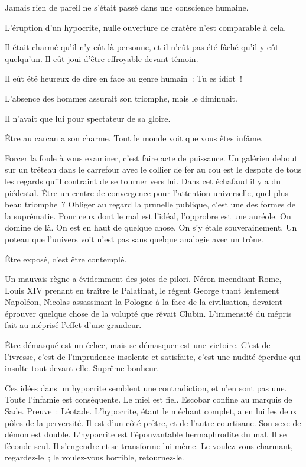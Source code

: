 \documentclass[french,twoside]{book} %
\begin{document}
Jamais rien de pareil ne s’était passé dans une conscience humaine.\par
L’éruption d’un hypocrite, nulle ouverture de cratère n’est comparable à cela.\par
Il était charmé qu’il n’y eût là personne, et il n’eût pas été fâché qu’il y eût quelqu’un. Il eût joui d’être effroyable devant témoin.\par
 Il eût été heureux de dire en face au genre humain : Tu es idiot !\par
L’absence des hommes assurait son triomphe, mais le diminuait.\par
Il n’avait que lui pour spectateur de sa gloire.\par
Être au carcan a son charme. Tout le monde voit que vous êtes infâme.\par
Forcer la foule à vous examiner, c’est faire acte de puissance. Un galérien debout sur un tréteau dans le carrefour avec le collier de fer au cou est le despote de tous les regards qu’il contraint de se tourner vers lui. Dans cet échafaud il y a du piédestal. Être un centre de convergence pour l’attention universelle, quel plus beau triomphe ? Obliger au regard la prunelle publique, c’est une des formes de la suprématie. Pour ceux dont le mal est l’idéal, l’opprobre est une auréole. On domine de là. On est en haut de quelque chose. On s’y étale souverainement. Un poteau que l’univers voit n’est pas sans quelque analogie avec un trône.\par
Être exposé, c’est être contemplé.\par
Un mauvais règne a évidemment des joies de pilori. Néron incendiant Rome, Louis XIV prenant en traître le Palatinat, le régent George tuant lentement Napoléon, Nicolas assassinant la Pologne à la face de la civilisation, devaient éprouver quelque chose de la volupté que rêvait Clubin. L’immensité du mépris fait au méprisé l’effet d’une grandeur.\par
Être démasqué est un échec, mais se démasquer est une victoire. C’est de l’ivresse, c’est de l’imprudence insolente et satisfaite, c’est une nudité  éperdue qui insulte tout devant elle. Suprême bonheur.\par
Ces idées dans un hypocrite semblent une contradiction, et n’en sont pas une. Toute l’infamie est conséquente. Le miel est fiel. Escobar confine au marquis de Sade. Preuve : Léotade. L’hypocrite, étant le méchant complet, a en lui les deux pôles de la perversité. Il est d’un côté prêtre, et de l’autre courtisane. Son sexe de démon est double. L’hypocrite est l’épouvantable hermaphrodite du mal. Il se féconde seul. Il s’engendre et se transforme lui-même. Le voulez-vous charmant, regardez-le ; le voulez-vous horrible, retournez-le.\par
\end{document}
